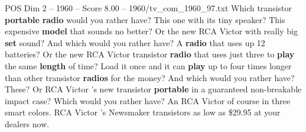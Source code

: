 \begin{textsample}{POS Dim 2 – 1960 – Score 8.00 – 1960/tv\_com\_1960\_97.txt}  \label{ex:f2_pos_021}
Which transistor \textbf{portable} \textbf{radio} would you rather have?
This one with its tiny speaker?
This expensive \textbf{model} that sounds no better?
Or the new RCA Victor with really big \textbf{set} sound?
And which would you rather have?
A \textbf{radio} that uses up 12 batteries?
Or the new RCA Victor transistor \textbf{radio} that uses just three to \textbf{play} the same \textbf{length} of time?
Load it once and it can \textbf{play} up to four times longer than other transistor \textbf{radios} for the money?
And which would you rather have?
These?
Or RCA Victor 's new transistor \textbf{portable} in a guaranteed non-breakable impact case?
Which would you rather have?
An RCA Victor of course in three smart colors.
RCA Victor 's Newsmaker transistors as low as \$29.95 at your dealers now.

\end{textsample}
